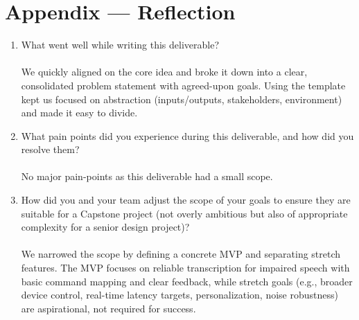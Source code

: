 \documentclass{article}
\begin{document}
\newpage{}

\section*{Appendix --- Reflection}




\begin{enumerate}
    \item What went well while writing this deliverable? \\ \\
    We quickly aligned on the core idea and broke it down into a clear, consolidated problem statement with agreed-upon goals. Using the template kept us focused on abstraction (inputs/outputs, stakeholders, environment) and made it easy to divide.
    \item What pain points did you experience during this deliverable, and how
    did you resolve them? \\ \\
    No major pain-points as this deliverable had a small scope.
    \item How did you and your team adjust the scope of your goals to ensure
    they are suitable for a Capstone project (not overly ambitious but also of
    appropriate complexity for a senior design project)? \\ \\
    We narrowed the scope by defining a concrete MVP and separating stretch features. The MVP focuses on reliable transcription for impaired speech with basic command mapping and clear feedback, while stretch goals (e.g., broader device control, real-time latency targets, personalization, noise robustness) are aspirational, not required for success.
\end{enumerate}  
\end{document}
